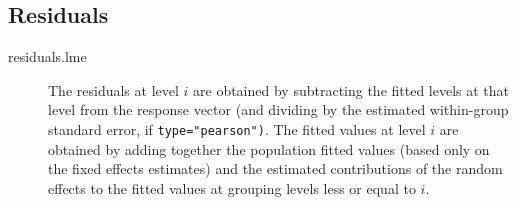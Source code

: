 \documentclass[12pt, a4paper]{report}
\theoremstyle{plain}
\theoremstyle{definition}
\theoremstyle{remark}
\begin{document}
	\subsection*{Residuals}
	
	\begin{description}
		\item[residuals.lme] 
		The residuals at level $i$ are obtained by subtracting the fitted levels at that level from the response
		vector (and dividing by the estimated within-group standard error, if \texttt{type="pearson")}. The fitted
		values at level $i$ are obtained by adding together the population fitted values (based only on the
		fixed effects estimates) and the estimated contributions of the random effects to the fitted values at
		grouping levels less or equal to $i$.
	\end{description}
	
\end{document}
